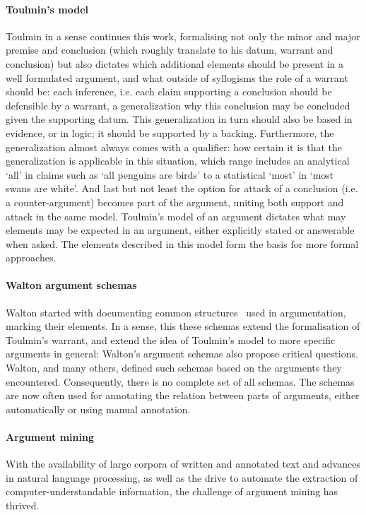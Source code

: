 \documentclass{IOS-Book-Article}
\begin{document}
\paragraph{Toulmin's model}
Toulmin\cite{toulmin1958} in a sense continues this work, formalising not only the minor and major premise and conclusion (which roughly translate to his datum, warrant and conclusion) but also dictates which additional elements should be present in a well formulated argument, and what outside of syllogisms the role of a warrant should be: each inference, i.e. each claim supporting a conclusion should be defensible by a warrant, a generalization why this conclusion may be concluded given the supporting datum. This generalization in turn should also be based in evidence, or in logic; it should be supported by a backing. Furthermore, the generalization almost always comes with a qualifier: how certain it is that the generalization is applicable in this situation, which range includes an analytical `all' in claims such as `all penguins are birds' to a statistical `most' in `most swans are white'. And last but not least the option for attack of a conclusion (i.e. a counter-argument) becomes part of the argument, uniting both support and attack in the same model. Toulmin's model of an argument dictates what may elements may be expected in an argument, either explicitly stated or answerable when asked. The elements described in this model form the basis for more formal approaches\cite{verheij2009}.

\paragraph{Walton argument schemas}
Walton started with documenting common structures~\cite{waltonReedMacagno2008} used in argumentation, marking their elements. In a sense, this these schemas extend the formalisation of Toulmin's warrant, and extend the idea of Toulmin's model to more specific arguments in general: Walton's argument schemas also propose critical questions. Walton, and many others, defined such schemas based on the arguments they encountered. Consequently, there is no complete set of all schemas. The schemas are now often used for annotating the relation between parts of arguments, either automatically or using manual annotation.

\paragraph{Argument mining}
With the availability of large corpora of written and annotated text\cite{lawrenceReed2015} and advances in natural language processing, as well as the drive to automate the extraction of computer-understandable information, the challenge of argument mining has thrived. \cite{moens2017,peldszus2013argument,lippi2016argumentation,mochales2011argumentation}
\end{document}
